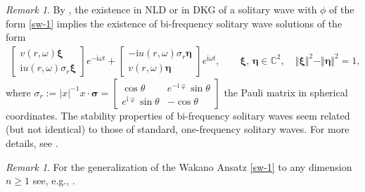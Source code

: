 \documentclass[12pt]{extarticle}
\newcommand{\jj}{\mathrm{i}}
\newcommand{\C}{\mathbb{C}}\newcommand{\Z}{\mathbb{Z}}
\newcommand{\abs}[1]{\vert #1 \vert}
\newcommand{\norm}[1]{\Vert #1 \Vert}
\theoremstyle{plain}
\theoremstyle{remark}
\newtheorem{remark}[lemma]{Remark}
\begin{document}
\begin{remark}
\label{remark-bi}
By
\cite{boussaid2018spectral},
the existence in NLD or in DKG
of a solitary wave
with $\phi$ of the form
\eqref{sw-1}
implies the existence of
bi-frequency solitary wave solutions  
of the form
\begin{align}
\begin{bmatrix}
v(r,\omega)\bm\xi
\\
\jj u(r,\omega)\sigma_r\bm\xi
\end{bmatrix}
e^{-\jj\omega t}
+
\begin{bmatrix}
-\jj u(r,\omega)\sigma_r\bm\eta
\\
v(r,\omega)\bm\eta
\end{bmatrix}
e^{\jj\omega t},
\qquad
\bm\xi,\,\bm\eta\in\C^2,
\quad
\norm{\bm\xi}^2-\norm{\bm\eta}^2=1,
\end{align}
where
$
\sigma_r
:=
\abs{x}^{-1}x\cdot\bm\sigma
=
\begin{bmatrix}
\cos\theta&e^{-\jj\upvarphi}\sin\theta
\\
e^{\jj\upvarphi}\sin\theta
&-\cos\theta
\end{bmatrix}$
the Pauli matrix in spherical coordinates.
The stability properties
of bi-frequency solitary waves
seem related (but not identical)
to those of standard,
one-frequency solitary waves.
For more details,
see \cite{comech2025stable}.
\end{remark}

\begin{remark}\label{remark-nd-1}
For the generalization of the Wakano
Ansatz \eqref{sw-1}
to any dimension $n\ge 1$
see, e.g.,
\cite[Chapter XII]{boussaid2019nonlinear}.
\end{remark}
\end{document}
